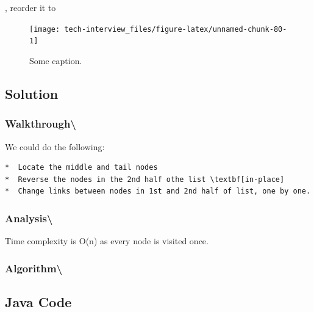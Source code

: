 \documentclass[]{book}
\begin{document}
, reorder it to

\begin{figure}
\texttt{[image: tech-interview\_files/figure-latex/unnamed-chunk-80-1]} \caption{Some caption.}\label{fig:unnamed-chunk-80}
\end{figure}

\hypertarget{solution-69}{%
\subsection{Solution}\label{solution-69}}

\hypertarget{walkthrough-116}{%
\subsubsection{Walkthrough\textbackslash{}}\label{walkthrough-116}}

We could do the following:

\begin{verbatim}
*  Locate the middle and tail nodes
*  Reverse the nodes in the 2nd half othe list \textbf[in-place]
*  Change links between nodes in 1st and 2nd half of list, one by one.
\end{verbatim}

\hypertarget{analysis-123}{%
\subsubsection{Analysis\textbackslash{}}\label{analysis-123}}

Time complexity is O(n) as every node is visited once.

\hypertarget{algorithm-128}{%
\subsubsection{Algorithm\textbackslash{}}\label{algorithm-128}}

\hypertarget{java-code-76}{%
\subsection{Java Code}\label{java-code-76}}
\end{document}
